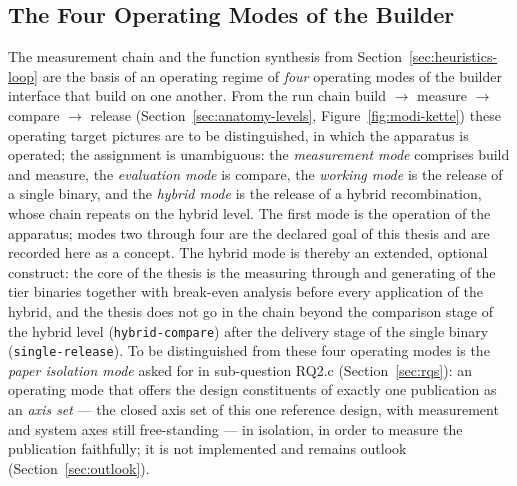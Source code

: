 \begin{nurlang}
\subsection{The Four Operating Modes of the Builder}\label{sec:heuristics-modes}
The measurement chain and the function synthesis from Section~\ref{sec:heuristics-loop} are the basis
of an operating regime of \emph{four} operating modes of the builder
interface that build on one another. From the run chain build $\to$ measure $\to$ compare $\to$ release
(Section~\ref{sec:anatomy-levels}, Figure~\ref{fig:modi-kette}) these operating target pictures are to be
distinguished, in which the apparatus is operated; the assignment is unambiguous: the \emph{measurement mode}
comprises build and measure, the \emph{evaluation mode} is compare, the \emph{working mode} is the
release of a single binary, and the \emph{hybrid mode} is the release of a hybrid recombination,
whose chain repeats on the hybrid level. The first mode is the operation of the apparatus; modes
two through four are the declared goal of this thesis and are recorded here as a concept. The
hybrid mode is thereby an extended, optional construct: the core of the thesis is the measuring through
and generating of the tier binaries together with break-even analysis before every application of the hybrid, and the thesis
does not go in the chain beyond the comparison stage of the hybrid level (\texttt{hybrid-compare}) after the
delivery stage of the single binary (\texttt{single-release}). To be distinguished from these four
operating modes is the \emph{paper isolation mode} asked for in sub-question RQ2.c (Section~\ref{sec:rqs}):
an operating mode that offers the design constituents of exactly one
publication as an \emph{axis set} --- the closed axis set of this one reference design,
with measurement and system axes still free-standing --- in isolation, in order to measure the publication
faithfully; it is not implemented and remains outlook (Section~\ref{sec:outlook}).
\end{nurlang}
